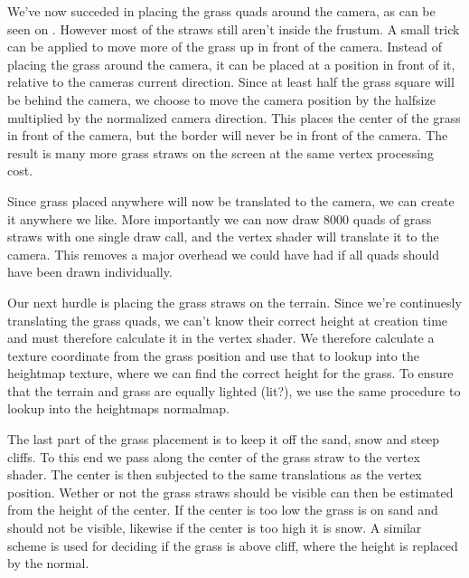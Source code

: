 
We've now succeded in placing the grass quads around the camera, as
can be seen on . However most of the
straws still aren't inside the frustum. A small trick can be applied
to move more of the grass up in front of the camera. Instead of
placing the grass around the camera, it can be placed at a position in
front of it, relative to the cameras current direction. Since at least
half the grass square will be behind the camera, we choose to move the
camera position by the halfsize multiplied by the normalized camera
direction. This places the center of the grass in front of the camera,
but the border will never be in front of the camera. The result is
many more grass straws on the screen at the same vertex processing
cost.


Since grass placed anywhere will now be translated to the camera, we
can create it anywhere we like. More importantly we can now draw 8000
quads of grass straws with one single draw call, and the vertex shader
will translate it to the camera. This removes a major overhead we
could have had if all quads should have been drawn individually.


Our next hurdle is placing the grass straws on the terrain. Since
we're continuesly translating the grass quads, we can't know their
correct height at creation time and must therefore calculate it in the
vertex shader. We therefore calculate a texture coordinate from the
grass position and use that to lookup into the heightmap texture,
where we can find the correct height for the grass. To ensure that the
terrain and grass are equally lighted (lit?), we use the same
procedure to lookup into the heightmaps normalmap.


The last part of the grass placement is to keep it off the sand, snow
and steep cliffs. To this end we pass along the center of the grass
straw to the vertex shader. The center is then subjected to the same
translations as the vertex position. Wether or not the grass straws
should be visible can then be estimated from the height of the
center. If the center is too low the grass is on sand and should not
be visible, likewise if the center is too high it is snow. A similar
scheme is used for deciding if the grass is above cliff, where the
height is replaced by the normal.

